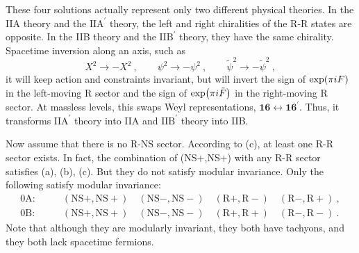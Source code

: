 	These four solutions actually represent only two different physical theories. In the IIA theory and the $\text{IIA}^{\prime}$ theory, the left and right chiralities of the R-R states are opposite. In the IIB theory and the $\text{IIB}^{\prime}$ theory, they have the same chirality. Spacetime inversion along an axis, such as
	\begin{equation}
		X^{2}\to-X^{2}\:,\qquad \psi^{2}\to -\psi^{2} \:, \qquad \tilde{\psi}^{2}\to -\tilde{\psi}^{2} \:,\label{10.6.7} 
	\end{equation}
	it will keep action and constraints invariant, but will invert the sign of $\exp(\pi i F)$ in the left-moving R sector and the sign of $\exp(\pi i \tilde{F})$ in the right-moving R sector. At massless levels, this swaps Weyl representations, $\mathbf{16}\leftrightarrow \mathbf{16}^{\prime}$. Thus, it transforms $\text{IIA}^{\prime}$ theory into IIA and $\text{IIB}^{\prime}$ theory into IIB.
	
	Now assume that there is no R-NS sector. According to (c), at least one R-R sector exists. In fact, the combination of (NS$+$,NS$+$) with any R-R sector satisfies (a), (b), (c). But they do not satisfy modular invariance. Only the following satisfy modular invariance:
	\begin{align*}
		\text{0A}:&\qquad (\text{NS}+,\text{NS}+)\quad (\text{NS}-,\text{NS}-)\quad (\text{R}+,\text{R}-)\quad (\text{R}-,\text{R}+) \:, \\
		\text{0B}:& \qquad (\text{NS}+,\text{NS}+)\quad (\text{NS}-,\text{NS}-)\quad (\text{R}+,\text{R}+)\quad (\text{R}-,\text{R}-) \:.
	\end{align*}
	Note that although they are modularly invariant, they both have tachyons, and they both lack spacetime fermions.
	
